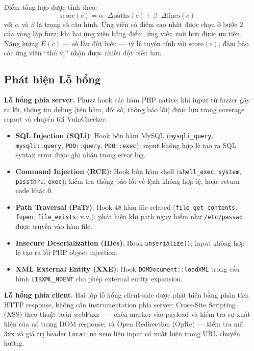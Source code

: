 Điểm tổng hợp được tính theo:
\[
    \text{score}(c) = \alpha \cdot \Delta\text{paths}(c)
                    + \beta  \cdot \Delta\text{lines}(c)
\]
với $\alpha$ và $\beta$ là trọng số cấu hình. Ứng viên có điểm cao nhất được
chọn ở bước 2 của vòng lặp fuzz; khi hai ứng viên bằng điểm, ứng viên mới
hơn được ưu tiên. Năng lượng $E(c)$ --- số lần đột biến --- tỷ lệ tuyến tính
với $\text{score}(c)$, đảm bảo các ứng viên ``thú vị'' nhận được nhiều đột
biến hơn.

\subsection{Phát hiện Lỗ hổng}
\label{subsec:phuzz-vulncheckers}

\textbf{Lỗ hổng phía server.} Phuzz hook các hàm PHP native; khi input từ
fuzzer gây ra lỗi, thông tin debug (tên hàm, đối số, thông báo lỗi) được lưu
trong coverage report và chuyển tới VulnChecker:

\begin{itemize}
    \item \textbf{SQL Injection (SQLi)}: Hook bốn hàm MySQL
    (\texttt{mysqli\_query}, \texttt{mysqli::query}, \texttt{PDO::query},
    \texttt{PDO::exec}); input không hợp lệ tạo ra SQL syntax error được ghi
    nhận trong error log.
    \item \textbf{Command Injection (RCE)}: Hook bốn hàm shell
    (\texttt{shell\_exec}, \texttt{system}, \texttt{passthru}, \texttt{exec});
    kiểm tra thông báo lỗi về lệnh không hợp lệ, hoặc return code khác 0.
    \item \textbf{Path Traversal (PaTr)}: Hook 48 hàm file-related
    (\texttt{file\_get\_contents}, \texttt{fopen}, \texttt{file\_exists},
    v.v.); phát hiện khi path nguy hiểm như \texttt{/etc/passwd} được truyền
    vào hàm file.
    \item \textbf{Insecure Deserialization (IDes)}: Hook \texttt{unserialize()};
    input không hợp lệ tạo ra lỗi PHP object injection.
    \item \textbf{XML External Entity (XXE)}: Hook \texttt{DOMDocument::loadXML}
    trong cấu hình \texttt{LIBXML\_NOENT} cho phép external entity expansion.
\end{itemize}

\textbf{Lỗ hổng phía client.} Hai lớp lỗ hổng client-side được phát hiện
bằng phân tích HTTP response, không cần instrumentation phía server:
Cross-Site Scripting (XSS) theo thuật toán webFuzz~\cite{vanrooij2021webfuzz}
--- chèn marker vào payload và kiểm tra sự xuất hiện của nó trong DOM
response; và Open Redirection (OpRe) --- kiểm tra mã 3xx và giá trị header
\texttt{Location} xem liệu input có xuất hiện trong URL chuyển hướng.

